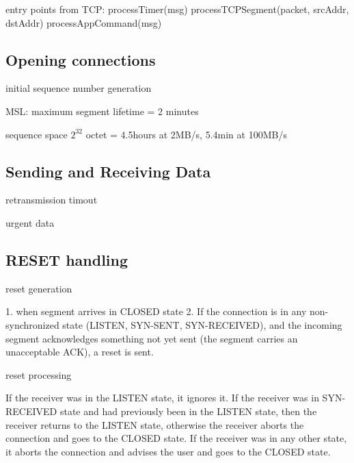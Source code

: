 entry points from TCP:
 processTimer(msg)
 processTCPSegment(packet, srcAddr, dstAddr)
 processAppCommand(msg)

\subsection{Opening connections}

initial sequence number generation

MSL: maximum segment lifetime = 2 minutes

sequence space $2^32$ octet = 4.5hours at 2MB/s, 5.4min at 100MB/s


\subsection{Sending and Receiving Data}

retransmission timout

urgent data



\subsection{RESET handling}

reset generation

 1. when segment arrives in CLOSED state
 2. If the connection is in any non-synchronized state (LISTEN,
    SYN-SENT, SYN-RECEIVED), and the incoming segment acknowledges
    something not yet sent (the segment carries an unacceptable ACK),
    a reset is sent.
    
reset processing

  If the
  receiver was in the LISTEN state, it ignores it.  If the receiver was
  in SYN-RECEIVED state and had previously been in the LISTEN state,
  then the receiver returns to the LISTEN state, otherwise the receiver
  aborts the connection and goes to the CLOSED state.  If the receiver
  was in any other state, it aborts the connection and advises the user
  and goes to the CLOSED state.

